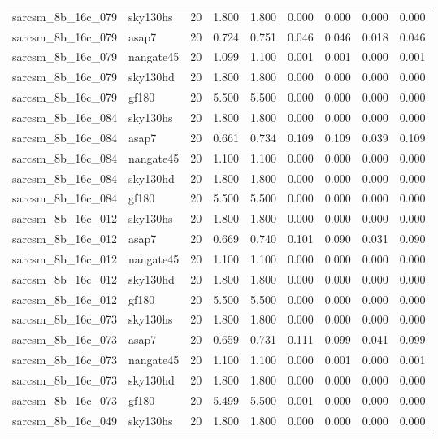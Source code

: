 \begin{tabular}{llrrrrrrr}
sarcsm\_8b\_16c\_079 & sky130hs & 20 & 1.800 & 1.800 & 0.000 & 0.000 & 0.000 & 0.000 \\
sarcsm\_8b\_16c\_079 & asap7 & 20 & 0.724 & 0.751 & 0.046 & 0.046 & 0.018 & 0.046 \\
sarcsm\_8b\_16c\_079 & nangate45 & 20 & 1.099 & 1.100 & 0.001 & 0.001 & 0.000 & 0.001 \\
sarcsm\_8b\_16c\_079 & sky130hd & 20 & 1.800 & 1.800 & 0.000 & 0.000 & 0.000 & 0.000 \\
sarcsm\_8b\_16c\_079 & gf180 & 20 & 5.500 & 5.500 & 0.000 & 0.000 & 0.000 & 0.000 \\
sarcsm\_8b\_16c\_084 & sky130hs & 20 & 1.800 & 1.800 & 0.000 & 0.000 & 0.000 & 0.000 \\
sarcsm\_8b\_16c\_084 & asap7 & 20 & 0.661 & 0.734 & 0.109 & 0.109 & 0.039 & 0.109 \\
sarcsm\_8b\_16c\_084 & nangate45 & 20 & 1.100 & 1.100 & 0.000 & 0.000 & 0.000 & 0.000 \\
sarcsm\_8b\_16c\_084 & sky130hd & 20 & 1.800 & 1.800 & 0.000 & 0.000 & 0.000 & 0.000 \\
sarcsm\_8b\_16c\_084 & gf180 & 20 & 5.500 & 5.500 & 0.000 & 0.000 & 0.000 & 0.000 \\
sarcsm\_8b\_16c\_012 & sky130hs & 20 & 1.800 & 1.800 & 0.000 & 0.000 & 0.000 & 0.000 \\
sarcsm\_8b\_16c\_012 & asap7 & 20 & 0.669 & 0.740 & 0.101 & 0.090 & 0.031 & 0.090 \\
sarcsm\_8b\_16c\_012 & nangate45 & 20 & 1.100 & 1.100 & 0.000 & 0.000 & 0.000 & 0.000 \\
sarcsm\_8b\_16c\_012 & sky130hd & 20 & 1.800 & 1.800 & 0.000 & 0.000 & 0.000 & 0.000 \\
sarcsm\_8b\_16c\_012 & gf180 & 20 & 5.500 & 5.500 & 0.000 & 0.000 & 0.000 & 0.000 \\
sarcsm\_8b\_16c\_073 & sky130hs & 20 & 1.800 & 1.800 & 0.000 & 0.000 & 0.000 & 0.000 \\
sarcsm\_8b\_16c\_073 & asap7 & 20 & 0.659 & 0.731 & 0.111 & 0.099 & 0.041 & 0.099 \\
sarcsm\_8b\_16c\_073 & nangate45 & 20 & 1.100 & 1.100 & 0.000 & 0.001 & 0.000 & 0.001 \\
sarcsm\_8b\_16c\_073 & sky130hd & 20 & 1.800 & 1.800 & 0.000 & 0.000 & 0.000 & 0.000 \\
sarcsm\_8b\_16c\_073 & gf180 & 20 & 5.499 & 5.500 & 0.001 & 0.000 & 0.000 & 0.000 \\
sarcsm\_8b\_16c\_049 & sky130hs & 20 & 1.800 & 1.800 & 0.000 & 0.000 & 0.000 & 0.000 \\

\end{tabular}
